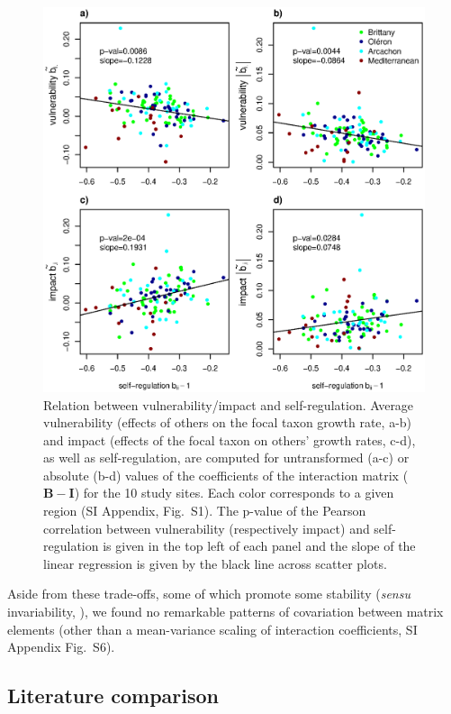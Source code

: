 \documentclass[9pt,twocolumn,twoside,lineno]{pnas-new}
\begin{document}
\begin{figure}[!h]
\centering
\includegraphics[width=17.8cm]{pencen_generality_vs_vulnerability_MainFig}
\caption{Relation between vulnerability/impact and self-regulation.
Average vulnerability (effects of others on the focal taxon growth
rate, a-b) and impact (effects of the focal taxon on others' growth
rates, c-d), as well as self-regulation, are computed for untransformed
(a-c) or absolute (b-d) values of the coefficients of the interaction
matrix ($\mathbf{B}-\mathbf{I}$) for the 10 study sites. Each color
corresponds to a given region (SI Appendix, Fig.~S1). The p-value
of the Pearson correlation between vulnerability (respectively impact)
and self-regulation is given in the top left of each panel and the
slope of the linear regression is given by the black line across scatter
plots.}
\label{fig:Vulnerability_impact}
\end{figure}

Aside from these trade-offs, some of which promote some stability
(\emph{sensu} invariability, ), we found no
remarkable patterns of covariation between matrix elements (other
than a mean-variance scaling of interaction coefficients, SI Appendix
Fig.~S6).

\subsection*{Literature comparison}
\end{document}
